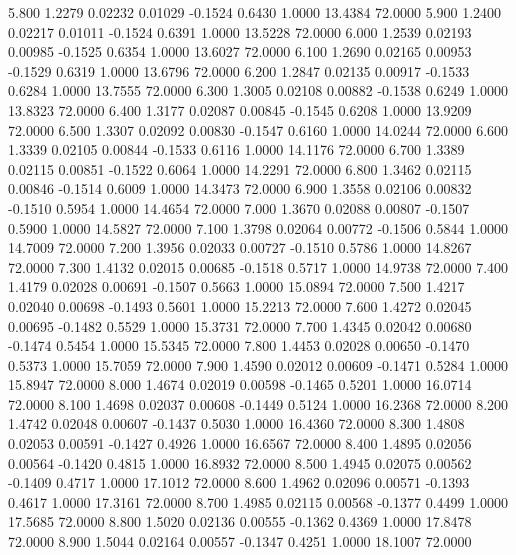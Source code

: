    5.800   1.2279   0.02232   0.01029  -0.1524   0.6430   1.0000  13.4384  72.0000
   5.900   1.2400   0.02217   0.01011  -0.1524   0.6391   1.0000  13.5228  72.0000
   6.000   1.2539   0.02193   0.00985  -0.1525   0.6354   1.0000  13.6027  72.0000
   6.100   1.2690   0.02165   0.00953  -0.1529   0.6319   1.0000  13.6796  72.0000
   6.200   1.2847   0.02135   0.00917  -0.1533   0.6284   1.0000  13.7555  72.0000
   6.300   1.3005   0.02108   0.00882  -0.1538   0.6249   1.0000  13.8323  72.0000
   6.400   1.3177   0.02087   0.00845  -0.1545   0.6208   1.0000  13.9209  72.0000
   6.500   1.3307   0.02092   0.00830  -0.1547   0.6160   1.0000  14.0244  72.0000
   6.600   1.3339   0.02105   0.00844  -0.1533   0.6116   1.0000  14.1176  72.0000
   6.700   1.3389   0.02115   0.00851  -0.1522   0.6064   1.0000  14.2291  72.0000
   6.800   1.3462   0.02115   0.00846  -0.1514   0.6009   1.0000  14.3473  72.0000
   6.900   1.3558   0.02106   0.00832  -0.1510   0.5954   1.0000  14.4654  72.0000
   7.000   1.3670   0.02088   0.00807  -0.1507   0.5900   1.0000  14.5827  72.0000
   7.100   1.3798   0.02064   0.00772  -0.1506   0.5844   1.0000  14.7009  72.0000
   7.200   1.3956   0.02033   0.00727  -0.1510   0.5786   1.0000  14.8267  72.0000
   7.300   1.4132   0.02015   0.00685  -0.1518   0.5717   1.0000  14.9738  72.0000
   7.400   1.4179   0.02028   0.00691  -0.1507   0.5663   1.0000  15.0894  72.0000
   7.500   1.4217   0.02040   0.00698  -0.1493   0.5601   1.0000  15.2213  72.0000
   7.600   1.4272   0.02045   0.00695  -0.1482   0.5529   1.0000  15.3731  72.0000
   7.700   1.4345   0.02042   0.00680  -0.1474   0.5454   1.0000  15.5345  72.0000
   7.800   1.4453   0.02028   0.00650  -0.1470   0.5373   1.0000  15.7059  72.0000
   7.900   1.4590   0.02012   0.00609  -0.1471   0.5284   1.0000  15.8947  72.0000
   8.000   1.4674   0.02019   0.00598  -0.1465   0.5201   1.0000  16.0714  72.0000
   8.100   1.4698   0.02037   0.00608  -0.1449   0.5124   1.0000  16.2368  72.0000
   8.200   1.4742   0.02048   0.00607  -0.1437   0.5030   1.0000  16.4360  72.0000
   8.300   1.4808   0.02053   0.00591  -0.1427   0.4926   1.0000  16.6567  72.0000
   8.400   1.4895   0.02056   0.00564  -0.1420   0.4815   1.0000  16.8932  72.0000
   8.500   1.4945   0.02075   0.00562  -0.1409   0.4717   1.0000  17.1012  72.0000
   8.600   1.4962   0.02096   0.00571  -0.1393   0.4617   1.0000  17.3161  72.0000
   8.700   1.4985   0.02115   0.00568  -0.1377   0.4499   1.0000  17.5685  72.0000
   8.800   1.5020   0.02136   0.00555  -0.1362   0.4369   1.0000  17.8478  72.0000
   8.900   1.5044   0.02164   0.00557  -0.1347   0.4251   1.0000  18.1007  72.0000
